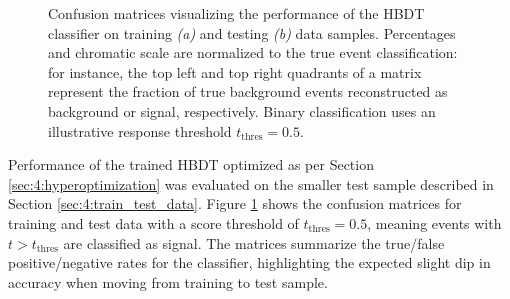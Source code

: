 \begin{figure}[t]
\begin{subfigure}{.45\textwidth}
		\caption{}
	\end{subfigure}
	\caption{Confusion matrices visualizing the performance of the HBDT classifier on training \textit{(a)} and testing \textit{(b)} data samples. Percentages and chromatic scale are normalized to the true event classification: for instance, the top left and top right quadrants of a matrix represent the fraction of true background events reconstructed as background or signal, respectively. Binary classification uses an illustrative response threshold $t_\text{thres} = 0.5$.}
	\label{fig:4:confusion_matrix}
\end{figure}

Performance of the trained HBDT optimized as per Section \ref{sec:4:hyperoptimization} was evaluated on the smaller test sample described in Section \ref{sec:4:train_test_data}.
Figure \ref{fig:4:confusion_matrix} shows the confusion matrices for training and test data with a score threshold of $t_\text{thres}=0.5$, meaning events with $t>t_\text{thres}$ are classified as signal.
The matrices summarize the true/false positive/negative rates for the classifier, highlighting the expected slight dip in accuracy when moving from training to test sample.

